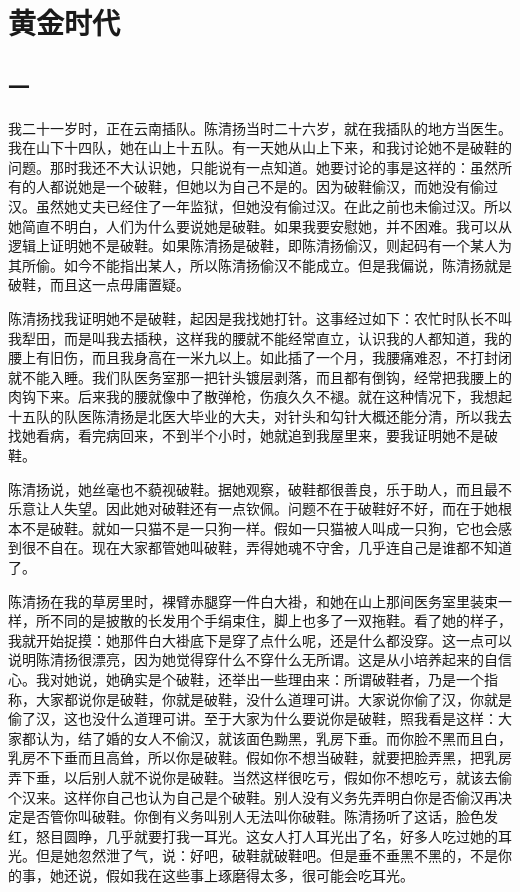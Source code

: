 \chapter{黄金时代}

\section{一}

我二十一岁时，正在云南插队。陈清扬当时二十六岁，就在我插队的地方当医生。我在山下十四队，她在山上十五队。有一天她从山上下来，和我讨论她不是破鞋的问题。那时我还不大认识她，只能说有一点知道。她要讨论的事是这祥的：虽然所有的人都说她是一个破鞋，但她以为自己不是的。因为破鞋偷汉，而她没有偷过汉。虽然她丈夫已经住了一年监狱，但她没有偷过汉。在此之前也未偷过汉。所以她简直不明白，人们为什么要说她是破鞋。如果我要安慰她，并不困难。我可以从逻辑上证明她不是破鞋。如果陈清扬是破鞋，即陈清扬偷汉，则起码有一个某人为其所偷。如今不能指出某人，所以陈清扬偷汉不能成立。但是我偏说，陈清扬就是破鞋，而且这一点毋庸置疑。 
 
陈清扬找我证明她不是破鞋，起因是我找她打针。这事经过如下：农忙时队长不叫我犁田，而是叫我去插秧，这样我的腰就不能经常直立，认识我的人都知道，我的腰上有旧伤，而且我身高在一米九以上。如此插了一个月，我腰痛难忍，不打封闭就不能入睡。我们队医务室那一把针头镀层剥落，而且都有倒钩，经常把我腰上的肉钩下来。后来我的腰就像中了散弹枪，伤痕久久不褪。就在这种情况下，我想起十五队的队医陈清扬是北医大毕业的大夫，对针头和勾针大概还能分清，所以我去找她看病，看完病回来，不到半个小时，她就追到我屋里来，要我证明她不是破鞋。 
 
陈清扬说，她丝毫也不藐视破鞋。据她观察，破鞋都很善良，乐于助人，而且最不乐意让人失望。因此她对破鞋还有一点钦佩。问题不在于破鞋好不好，而在于她根本不是破鞋。就如一只猫不是一只狗一样。假如一只猫被人叫成一只狗，它也会感到很不自在。现在大家都管她叫破鞋，弄得她魂不守舍，几乎连自己是谁都不知道了。 
 
陈清扬在我的草房里时，裸臂赤腿穿一件白大褂，和她在山上那间医务室里装束一样，所不同的是披散的长发用个手绢束住，脚上也多了一双拖鞋。看了她的样子，我就开始捉摸：她那件白大褂底下是穿了点什么呢，还是什么都没穿。这一点可以说明陈清扬很漂亮，因为她觉得穿什么不穿什么无所谓。这是从小培养起来的自信心。我对她说，她确实是个破鞋，还举出一些理由来：所谓破鞋者，乃是一个指称，大家都说你是破鞋，你就是破鞋，没什么道理可讲。大家说你偷了汉，你就是偷了汉，这也没什么道理可讲。至于大家为什么要说你是破鞋，照我看是这样：大家都认为，结了婚的女人不偷汉，就该面色黝黑，乳房下垂。而你脸不黑而且白，乳房不下垂而且高耸，所以你是破鞋。假如你不想当破鞋，就要把脸弄黑，把乳房弄下垂，以后别人就不说你是破鞋。当然这样很吃亏，假如你不想吃亏，就该去偷个汉来。这样你自己也认为自己是个破鞋。别人没有义务先弄明白你是否偷汉再决定是否管你叫破鞋。你倒有义务叫别人无法叫你破鞋。陈清扬听了这话，脸色发红，怒目圆睁，几乎就要打我一耳光。这女人打人耳光出了名，好多人吃过她的耳光。但是她忽然泄了气，说：好吧，破鞋就破鞋吧。但是垂不垂黑不黑的，不是你的事，她还说，假如我在这些事上琢磨得太多，很可能会吃耳光。 
 
